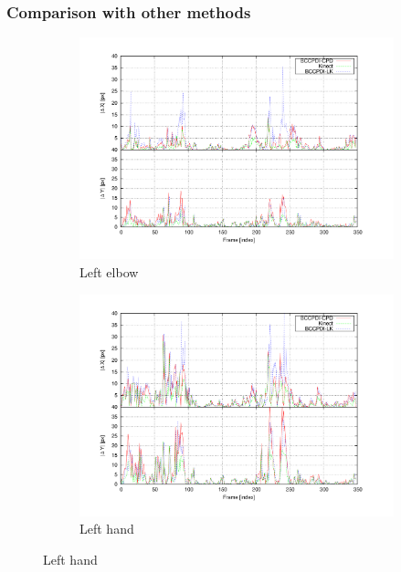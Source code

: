 \subsubsection{Comparison with other methods}\label{ch:chapter02_02_03}

\begin{figure}[t]
        \centering

        \begin{subfigure}[b]{0.5\columnwidth}
                \centering
                \includegraphics[width=\textwidth, trim=50 40 80 40,clip]{fig27.pdf}
                \caption{Left elbow}
                \label{fig:cp02_comparison_left_elbow}
        \end{subfigure}%
        \begin{subfigure}[b]{0.5\columnwidth}
                \centering
		  \includegraphics[width=\textwidth, trim=50 40 80 40,clip]{fig28.pdf}
                \caption{Left hand}
                \label{fig:cp02_comparison_left_hand}
        \end{subfigure}%


\end{figure}

